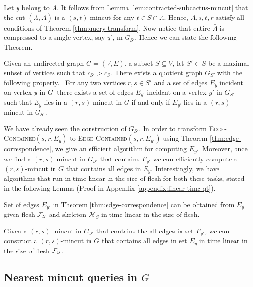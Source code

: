 Let $y$ belong to $\bar{A}$. It follows from Lemma \ref{lem:contracted-subcactus-mincut} that the cut $(A,\bar{A})$ is a $(s,t)$-mincut for any $t\in S\cap \bar{A}$. Hence, $A,s,t,r$ satisfy all conditions of Theorem  \ref{thm:query-transform}. Now notice that entire $\bar{A}$
is compressed to a single vertex, say $y'$, in $G_{S'}$. Hence we can state the following Theorem.



\begin{theorem} \label{thm:edge-correspondence}
Given an undirected graph $G=(V,E)$, a subset $S\subseteq V$, let $S'\subset S$ be a maximal subset of vertices such that $c_{S'}>c_S$.
There exists a quotient graph $G_{S'}$ with the following property.~
For any two vertices $r,s \in S'$ and a set of edges $E_y$ incident on vertex $y$ in $G$, there exists a set of edges $E_{y'}$ incident on a vertex $y'$ in $G_{S'}$ such that $E_y$ lies in a $(r,s)$-mincut in $G$ if and only if $E_{y'}$ lies in a $(r,s)$-mincut in $G_{S'}$. 
\end{theorem}

We have already seen the construction of $G_{S'}$. In order to transform  \textsc{Edge-Contained}$(s,r,E_y)$ to \textsc{Edge-Contained}$(s,r,E_{y'})$  using Theorem \ref{thm:edge-correspondence}, we give an efficient algorithm for computing $E_{y'}$. Moreover, once we find a $(r,s)$-mincut in $G_{S'}$ that contains $E_{y'}$ we can efficiently compute a $(r,s)$-mincut in $G$ that contains all edges in $E_{y}$. Interestingly, we have algorithms that run in time linear in the size of flesh for both these tasks, stated in the following Lemma (Proof in Appendix \ref{appendix:linear-time-qt}). 

\begin{lemma}
\label{lem:linear-time-qt}
Set of edges $E_{y'}$ in Theorem \ref{thm:edge-correspondence} can be obtained from $E_y$ given flesh ${\cal F}_S$ and skeleton $\mathcal H_S$ in time linear in the size of flesh.
\end{lemma}

\begin{lemma}
\label{lem:mincut-qt}
Given a $(r,s)$-mincut in $G_{S'}$ that contains the all edges in set $E_{y'}$, we can construct a $(r,s)$-mincut in $G$ that contains all edges in set $E_y$ in time linear in the size of flesh ${\cal F}_S$.
\end{lemma}


\subsection{Nearest mincut queries in \texorpdfstring{$G$}{graph}}

